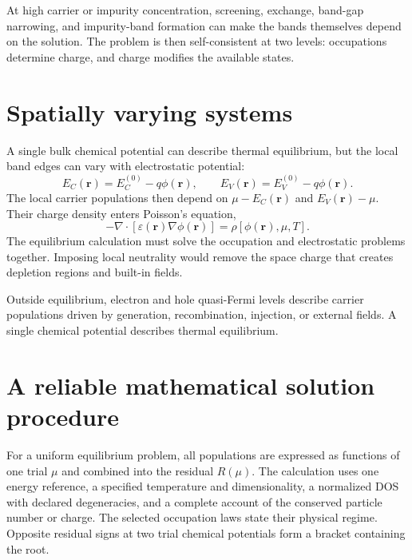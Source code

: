 At high carrier or impurity concentration, screening, exchange, band-gap
narrowing, and impurity-band formation can make the bands themselves depend on
the solution.  The problem is then self-consistent at two levels: occupations
determine charge, and charge modifies the available states.

\section{Spatially varying systems}

A single bulk chemical potential can describe thermal equilibrium, but the
local band edges can vary with electrostatic potential:
\begin{equation}
  E_C(\bm r)=E_C^{(0)}-q\phi(\bm r),
  \qquad
  E_V(\bm r)=E_V^{(0)}-q\phi(\bm r).
  \label{eq:local-band-edges-electrostatic-potential}
\end{equation}
The local carrier populations then depend on $\mu-E_C(\bm r)$ and
$E_V(\bm r)-\mu$.  Their charge density enters Poisson's equation,
\begin{equation}
  -\nabla\cdot[\varepsilon(\bm r)\nabla\phi(\bm r)]
  =\rho[\phi(\bm r),\mu,T].
  \label{eq:chemical-potential-poisson-closure}
\end{equation}
The equilibrium calculation must solve the occupation and electrostatic
problems together.  Imposing local neutrality would remove the space charge
that creates depletion regions and built-in fields.

Outside equilibrium, electron and hole quasi-Fermi levels describe carrier
populations driven by generation, recombination, injection, or external fields.
A single chemical potential describes thermal equilibrium.

\section{A reliable mathematical solution procedure}

For a uniform equilibrium problem, all populations are expressed as functions
of one trial $\mu$ and combined into the residual $R(\mu)$.  The calculation
uses one energy reference, a specified temperature and dimensionality, a
normalized DOS with declared degeneracies, and a complete account of the
conserved particle number or charge.  The selected occupation laws state their
physical regime.  Opposite residual signs at two trial chemical potentials
form a bracket containing the root.

